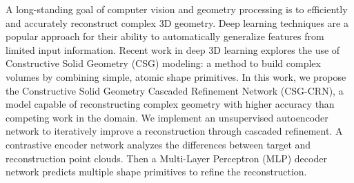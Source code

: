 
A long-standing goal of computer vision and geometry processing is to efficiently and accurately reconstruct complex 3D geometry. Deep learning techniques are a popular approach for their ability to automatically generalize features from limited input information. Recent work in deep 3D learning explores the use of Constructive Solid Geometry (CSG) modeling: a method to build complex volumes by combining simple, atomic shape primitives. In this work, we propose the Constructive Solid Geometry Cascaded Refinement Network (CSG-CRN), a model capable of reconstructing complex geometry with higher accuracy than competing work in the domain. We implement an unsupervised autoencoder network to iteratively improve a reconstruction through cascaded refinement. A contrastive encoder network analyzes the differences between target and reconstruction point clouds. Then a Multi-Layer Perceptron (MLP) decoder network predicts multiple shape primitives to refine the reconstruction.

\bigskip
\noindent
{}